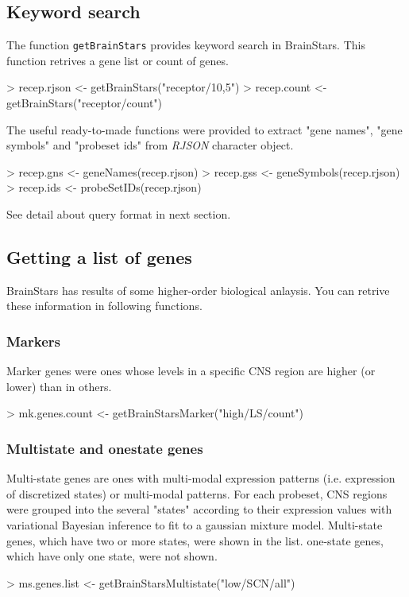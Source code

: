 \documentclass[12pt,fullpage]{article}
\newcommand{\Rfunction}[1]{{\texttt{#1}}}
\newcommand{\Rpackage}[1]{{\textit{#1}}}
\begin{document}
\subsection{Keyword search}
The function \Rfunction{getBrainStars} provides keyword search in BrainStars. This function retrives a gene list or count of genes.
\begin{Schunk}
\begin{Sinput}
> recep.rjson <- getBrainStars("receptor/10,5")
> recep.count <- getBrainStars("receptor/count")
\end{Sinput}
\end{Schunk}
The useful ready-to-made functions were provided to extract "gene names", "gene symbols" and "probeset ids" from \Rpackage{RJSON} character object.
\begin{Schunk}
\begin{Sinput}
> recep.gns <- geneNames(recep.rjson)
> recep.gss <- geneSymbols(recep.rjson)
> recep.ids <- probeSetIDs(recep.rjson)
\end{Sinput}
\end{Schunk}
See detail about query format in next section.

\subsection{Getting a list of genes}
BrainStars has results of some higher-order biological anlaysis. You can retrive these information in following functions.

\subsubsection{Markers}
Marker genes were ones whose levels in a specific CNS region are higher (or lower) than in others.
\begin{Schunk}
\begin{Sinput}
> mk.genes.count <- getBrainStarsMarker("high/LS/count")
\end{Sinput}
\end{Schunk}
\subsubsection{Multistate and onestate genes}
Multi-state genes are ones with multi-modal expression patterns (i.e. expression of discretized states) or multi-modal patterns. For each probeset, CNS regions were grouped into the several "states" according to their expression values with variational Bayesian inference to fit to a gaussian mixture model. Multi-state genes, which have two or more states, were shown in the list. one-state genes, which have only one state, were not shown.
\begin{Schunk}
\begin{Sinput}
> ms.genes.list <- getBrainStarsMultistate("low/SCN/all")
\end{Sinput}
\end{Schunk}
\end{document}
